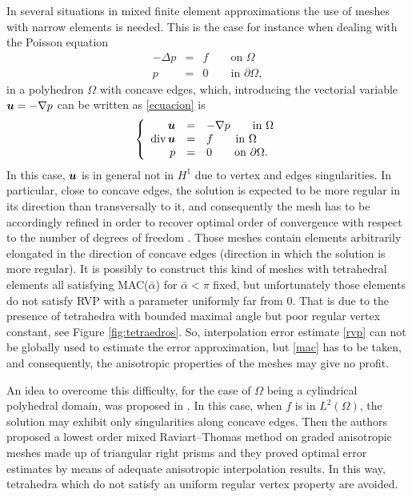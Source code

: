 In several situations in mixed finite element approximations the use of meshes with narrow elements is needed. This is the case for instance when dealing with the Poisson equation 
\begin{eqnarray}\label{ecuacion}
-\Delta p &=& f\qquad \mbox{on }\Omega\\\nonumber p&=&0\qquad \mbox{in }\partial\Omega,
\end{eqnarray}
in a polyhedron $\Omega$ with concave edges, which, introducing the vectorial variable $\boldsymbol{u}=-\nabla p$ can be written as
\eqref{ecuacion} is
\begin{equation}\label{mf} \left\{\begin{array}{rcl}
\boldsymbol{u}&=&-\nabla p\qquad \mbox{in }\Omega\\
\mbox{div\,}\boldsymbol{u}&=&f\qquad \mbox{in }\Omega\\
p&=&0\qquad\mbox{on }\partial\Omega.\end{array}\right.
\end{equation}
In this case,  $\boldsymbol{u}$ is in general not in $H^1$ due to vertex and edges singularities. In particular, close to concave edges, the solution is expected to be more regular in its direction than transversally to it, and consequently the mesh has to be accordingly refined in order to recover optimal order of convergence with respect to the number of degrees of freedom 
\cite{alw, apelNicaise}. Those meshes contain elements arbitrarily elongated in the direction of concave edges (direction in which the solution is more regular). It is possibly to construct this kind of meshes with tetrahedral elements all satisfying MAC($\bar\alpha$) for $\bar\alpha<\pi$ fixed, but unfortunately those elements do not satisfy RVP with a parameter uniformly far from $0$. That is due to the presence of tetrahedra with bounded maximal angle but poor regular vertex constant, see Figure \ref{fig:tetraedros}. So, interpolation error estimate \eqref{rvp} can not be globally used to estimate the error approximation, but \eqref{mac} has to be taken, and consequently, the anisotropic properties of the meshes may give no profit.  

\tetsTikz


An idea to overcome this difficulty, for the case of $\Omega$ being a cylindrical polyhedral domain, was proposed in \cite{MR1866274}. In  this case, when $f$ is in $L^2(\Omega)$, the solution may exhibit only singularities along concave edges. Then the authors proposed a lowest order mixed Raviart--Thomas method on graded anisotropic meshes made up of triangular right prisms and they proved optimal error estimates by means of adequate anisotropic interpolation results. In this way, tetrahedra which do not satisfy an uniform regular vertex property are avoided. 

